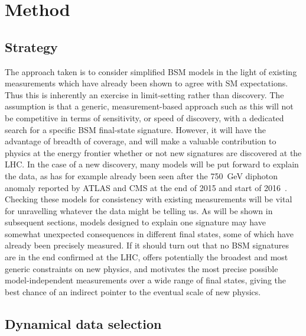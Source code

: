 \documentclass[floatfix]{article}
\begin{document}
\section{Method}
\label{sec:method}

\subsection{Strategy}

The approach taken is to consider simplified BSM models in the light of existing measurements which have already been shown to agree with SM expectations.
Thus this is inherently an exercise in limit-setting rather than discovery. The assumption is that a generic, measurement-based approach such as this will not be
competitive in terms of sensitivity, or speed of discovery, with a dedicated search for a specific BSM final-state signature. However, it will have the
advantage of breadth of coverage, and will make a valuable contribution to physics at the energy frontier whether or not new signatures are discovered at the LHC.
In the case of a new discovery, many models will be put forward to explain the data, as has for example already been seen\cite{PhysRevLett.116.150001} 
after the 750~GeV diphoton anomaly 
reported by ATLAS and CMS at the end of 2015 and start of 2016~\cite{ATLAS-CONF-2016-018,CMS-PAS-EXO-16-018}. 
Checking these models for consistency with existing measurements will be vital for unravelling whatever 
the data might be telling us. As will be shown in subsequent sections, models designed to explain one signature may have somewhat unexpected consequences 
in different final states, some of which have already been precisely measured. If it should turn out that no BSM signatures are in the end confirmed at the LHC,
\Contur offers potentially the broadest and most generic constraints on new physics, and motivates the most precise possible model-independent measurements
over a wide range of final states, giving the best chance of an indirect pointer to the eventual scale of new physics.

\subsection{Dynamical data selection}\label{sec:dynselec}
\label{sec:selec}
\end{document}
